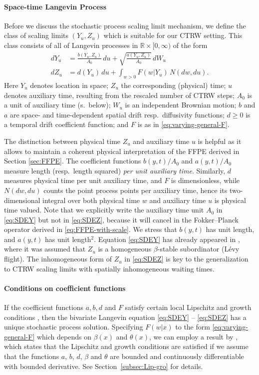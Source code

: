 \documentclass[a4paper,12pt]{elsarticle}
\numberwithin{equation}{section}
\theoremstyle{plain}
\theoremstyle{definition}
\theoremstyle{remark}
\numberwithin{equation}{section}
\newcommand{\spc}{\mathbb R}
\newcommand{\spctim}{\spc \times [0,\infty)}
\newcommand{\1}{\mathbf 1}
\begin{document}
\paragraph{Space-time Langevin Process}
Before we discuss the stochastic process scaling limit mechanism, we 
define the class of scaling limits $(Y_u, Z_u)$ which is suitable for our CTRW setting. This class consists of all of Langevin processes in 
$\spctim$ of the form
\begin{align} \label{eq:SDEY}
dY_u &= \frac{b(Y_{u}, Z_{u})}{A_0}\,du + \sqrt{\frac{a(Y_{u}, Z_{u})}{A_0}}\, dW_u \\
\label{eq:SDEZ}
dZ_u &= d(Y_{u})\,du + \int_{w > 0} F(w | Y_{u}) \, N(dw, du).
\end{align}
Here $Y_u$ denotes location in space; $Z_u$ the corresponding (physical) time;
$u$ denotes auxiliary time, resulting from the rescaled number of CTRW steps;
$A_0$ is a unit of auxiliary time (s.\ below);
$W_u$ is an independent Brownian motion; 
$b$ and $a$ are space- and time-dependent
spatial drift resp.\ diffusivity functions; $d \ge 0$ is a temporal drift coefficient function;
and $F$ is as in \eqref{eq:varying-general-F}.

The distinction between physical time $Z_u$ and auxiliary time $u$ is helpful
as it allows to maintain a coherent physical interpretation of the FFPE derived
in Section \ref{sec:FFPE}.  The coefficient functions $b(y,t)/A_0$ and $a(y,t)/A_0$ measure
length (resp.\ length squared) \emph{per unit auxiliary time}.  Similarly,
$d$ measures physical time per unit auxiliary time, and $F$ is 
dimensionless, while $N(dw,du)$ counts the point process points
per auxiliary time, hence its two-dimensional integral over both physical 
time $w$ and auxiliary time $u$ is physical time valued.
Note that we explicitly write the auxiliary time unit $A_0$ in 
\eqref{eq:SDEY} but not in \eqref{eq:SDEZ}, because it will cancel in the 
Fokker--Planck operator derived in \eqref{eq:FFPE-with-scale}.
We stress that $b(y,t)$ has unit length, and $a(y,t)$ has unit 
length$^2$.
Equation \eqref{eq:SDEY} has already appeared in \cite{Weron2008}, where
it was assumed that $Z_u$ is a homogeneous $\beta$-stable subordinator (L\'evy
flight).
The inhomogeneous form of $Z_u$ in \eqref{eq:SDEZ} is key to the generalization
to CTRW scaling limits with spatially inhomogeneous waiting times.



\paragraph{Conditions on coefficient functions}
If the coefficient functions $a, b, d$ and $F$ satisfy certain local 
Lipschitz and growth conditions \cite[Chapter 6]{Applebaum}, then the bivariate
Langevin equation \eqref{eq:SDEY} -- \eqref{eq:SDEZ} has a unique stochastic 
process solution.  Specifying $F(w|x)$ to the form \eqref{eq:varying-general-F} which depends on 
$\beta(x)$ and $\theta(x)$, we can employ a result by \cite{Tsuchiya1992}, 
which states that the Lipschitz and growth conditions are 
satisfied if we assume that the functions $a$, $b$, $d$, $\beta$ and $\theta$ 
are bounded and continuously differentiable with bounded derivative.
See Section~\ref{subsec:Lip-gro} for details.
\end{document}
